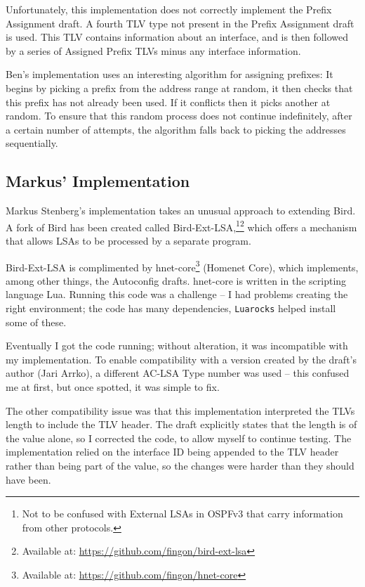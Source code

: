 \documentclass[12pt,a4paper,twoside]{report}
\begin{document}
Unfortunately, this implementation does not correctly implement the Prefix
Assignment draft. A fourth TLV type not present in the Prefix Assignment draft
is used. This TLV contains information about an interface, and is then followed
by a series of Assigned Prefix TLVs minus any interface information. 

Ben's implementation uses an interesting algorithm for assigning prefixes:
It begins by picking a prefix from the address range at random, it then checks
that this prefix has not already been used. If it conflicts then it picks
another at random. To ensure that this random process does not continue
indefinitely, after a certain number of attempts, the algorithm falls back to
picking the addresses sequentially. 

\subsection{Markus' Implementation}
Markus Stenberg's implementation takes an unusual approach to extending Bird. A
fork of Bird has been created called Bird-Ext-LSA\@,\footnote{Not to be
confused with External LSAs in OSPFv3 that carry information from other
protocols.}\footnote{Available at:
\url{https://github.com/fingon/bird-ext-lsa}} which offers a mechanism that
allows LSAs to be processed by a separate program. 

Bird-Ext-LSA is complimented by hnet-core\footnote{Available at:
\url{https://github.com/fingon/hnet-core}} (Homenet Core), which implements,
among other things, the Autoconfig drafts\@.  hnet-core is written in the
scripting language Lua. Running this code was a challenge -- I had problems
creating the right environment; the code has many dependencies,
\texttt{Luarocks} helped install some of these. 

Eventually I got the code running; without alteration, it was incompatible with
my implementation. To enable compatibility with a version created by the
draft's author (Jari Arrko), a different AC-LSA Type number was used -- this
confused me at first, but once spotted, it was simple to fix.

The other compatibility issue was that this implementation interpreted the TLVs
length to include the TLV header. The draft explicitly states that the length is
of the value alone, so I corrected the code, to allow myself to continue
testing. The implementation relied on the interface ID being appended to the
TLV header rather than being part of the value, so the changes were harder than
they should have been.
\end{document}
